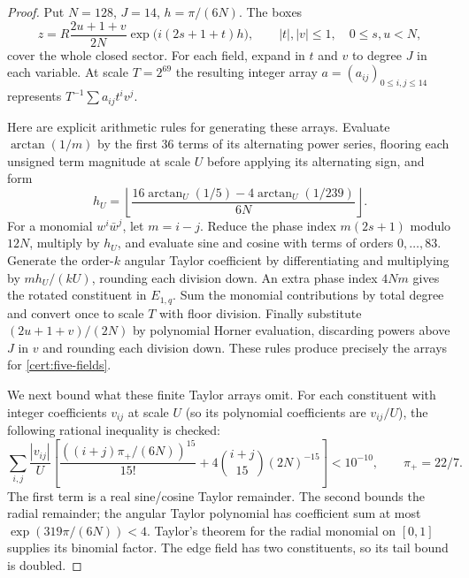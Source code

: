 \begin{proof}
Put $N=128$, $J=14$, $h=\pi/(6N)$.  The boxes
\begin{equation}\label{cert:polar-box}
 z=R\frac{2u+1+v}{2N}\exp\bigl(i(2s+1+t)h\bigr),\qquad
 |t|,|v|\leq1,\quad 0\leq s,u<N,
\end{equation}
cover the whole closed sector.  For each field, expand in $t$ and $v$ to
degree $J$ in each variable.  At scale $T=2^{69}$ the resulting integer
array $a=(a_{ij})_{0\leq i,j\leq14}$ represents
$T^{-1}\sum a_{ij}t^iv^j$.

Here are explicit arithmetic rules for generating these arrays.  Evaluate
$\arctan(1/m)$ by the first 36 terms of its alternating power series,
flooring each unsigned term magnitude at scale $U$ before applying its
alternating sign, and form
\[
 h_U=\left\lfloor\frac{16\arctan_U(1/5)-4\arctan_U(1/239)}{6N}\right\rfloor.
\]
For a monomial $w^i\bar w^j$, let $m=i-j$.  Reduce the phase index
$m(2s+1)$ modulo $12N$, multiply by $h_U$, and evaluate sine and cosine
with terms of orders $0,\ldots,83$.  Generate the order-$k$ angular Taylor
coefficient by differentiating and multiplying by $mh_U/(kU)$, rounding
each division down.  An extra phase index $4Nm$ gives the rotated
constituent in $E_{1,q}$.  Sum the monomial contributions by total degree
and convert once to scale $T$ with floor division.  Finally substitute
$(2u+1+v)/(2N)$ by polynomial Horner evaluation, discarding powers above
$J$ in $v$ and rounding each division down.  These rules produce precisely
the arrays for \eqref{cert:five-fields}.

We next bound what these finite Taylor arrays omit.  For each constituent with integer coefficients $v_{ij}$ at scale $U$
(so its polynomial coefficients are $v_{ij}/U$), the following rational
inequality is checked:
\begin{equation}\label{cert:taylor-tail}
 \sum_{i,j}\frac{|v_{ij}|}{U}\left[
  \frac{((i+j)\pi_+/(6N))^{15}}{15!}
       +4\binom{i+j}{15}(2N)^{-15}\right]<10^{-10},
 \qquad \pi_+=22/7.
\end{equation}
The first term is a real sine/cosine Taylor remainder.  The second bounds
the radial remainder; the angular Taylor polynomial has coefficient sum
at most $\exp(319\pi/(6N))<4$.  Taylor's theorem for the radial monomial
on $[0,1]$ supplies its binomial factor.  The edge field has two
constituents, so its tail bound is doubled.


\end{proof}
